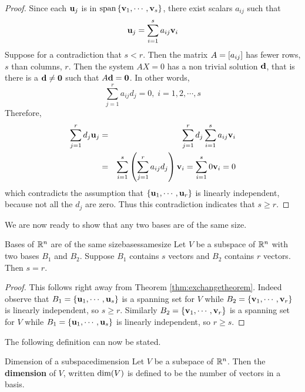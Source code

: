 \begin{proof}
Since each ${\bf u}_j$ is in $\mbox{span}\left\{{\bf v}_{1},\cdots ,{\bf v}_{s}\right\} 
$, there exist scalars $a_{ij}$ such that 
\begin{equation*}
{\bf u}_{j}=\sum_{i=1}^{s}a_{ij}{\bf v}_{i}
\end{equation*}
Suppose for a contradiction that $s<r$. Then the matrix $A = \left[
a_{ij} \right]$ has fewer rows, $s$ than columns, $r$. Then the system
$AX=0$ has %
a non trivial solution ${\bf d}$, that is there is a  ${\bf d}\neq {\bf 0}$ such that  $A{\bf d}={\bf 0}$. In other
words, 
\begin{equation*}
\sum_{j=1}^{r}a_{ij}d_{j}=0,\;i=1,2,\cdots ,s
\end{equation*}
Therefore, 
\begin{eqnarray*}
\sum_{j=1}^{r}d_{j}{\bf u}_{j} &=&\sum_{j=1}^{r}d_{j}\sum_{i=1}^{s}a_{ij}
{\bf v}_{i} \\
&=&\sum_{i=1}^{s}\left(\sum_{j=1}^{r}a_{ij}d_{j}\right) {\bf v}
_{i}=\sum_{i=1}^{s}0{\bf v}_{i}=0
\end{eqnarray*}
which contradicts the assumption that $\left\{{\bf u}_{1},\cdots ,{\bf u}_{r}\right\} $
is linearly independent, because not all the $d_{j}$ are zero. Thus this contradiction indicates that $s\geq r$. 
\end{proof}

We are now ready to show that any two bases are of the same size. 

\begin{theorem}{Bases of $\mathbb{R}^{n}$ are of the same size}{basessamesize}
Let $V$ be a subspace of $\mathbb{R}^{n}$ with two bases $B_1$ and $B_2$. Suppose $B_1$ contains $s$ vectors and $B_2$ contains $r$ vectors. Then $s=r.$
\end{theorem}

\begin{proof}
This follows right away from Theorem \ref{thm:exchangetheorem}. Indeed
observe that $B_1 = \left\{
{\bf u}_{1},\cdots ,{\bf u}_{s}\right\} $ is a spanning set for $V$ while $
B_2 = \left\{{\bf v}_{1},\cdots ,{\bf v}_{r}\right\} $ is linearly
independent, so $s \geq r.$ Similarly $B_2 = \left\{{\bf v}_{1},\cdots ,{\bf v}
_{r}\right\} $ is a spanning set for $V$ while $B_1 = \left\{{\bf u}_{1},\cdots ,
{\bf u}_{s}\right\} $ is linearly independent,  so $r\geq s$.
\end{proof}

The following definition can now be stated.

\begin{definition}{Dimension of a subspace}{dimension}
Let $V$ be a subspace of $\mathbb{R}^{n}$. Then the \textbf{dimension }of $V$, written $\mbox{dim}(V)$
is defined to be the number of vectors in a basis.
\end{definition}

